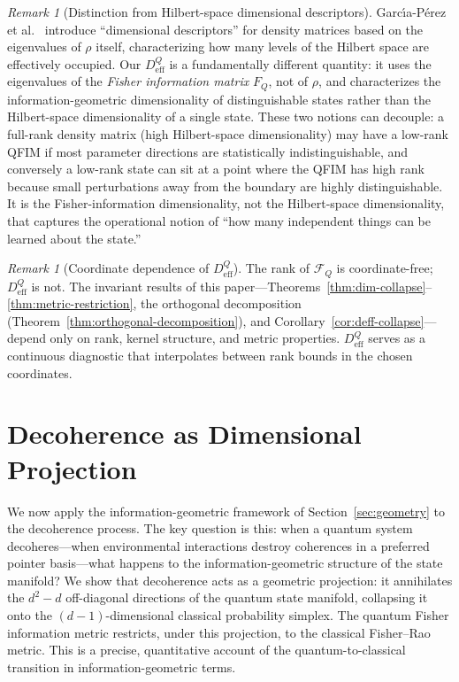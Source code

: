 \documentclass[12pt,a4paper]{article}
\theoremstyle{definition}
\theoremstyle{remark}
\newtheorem{remark}[theorem]{Remark}
\begin{document}
\begin{remark}[Distinction from Hilbert-space dimensional descriptors]
\label{rem:garcia}
Garc\'{\i}a-P\'{e}rez et al.\ \cite{garcia2023descriptors} introduce ``dimensional descriptors'' for density matrices based on the eigenvalues of $\rho$ itself, characterizing how many levels of the Hilbert space are effectively occupied. Our $D_{\mathrm{eff}}^Q$ is a fundamentally different quantity: it uses the eigenvalues of the \emph{Fisher information matrix} $F_Q$, not of $\rho$, and characterizes the information-geometric dimensionality of distinguishable states rather than the Hilbert-space dimensionality of a single state. These two notions can decouple: a full-rank density matrix (high Hilbert-space dimensionality) may have a low-rank QFIM if most parameter directions are statistically indistinguishable, and conversely a low-rank state can sit at a point where the QFIM has high rank because small perturbations away from the boundary are highly distinguishable. It is the Fisher-information dimensionality, not the Hilbert-space dimensionality, that captures the operational notion of ``how many independent things can be learned about the state.''
\end{remark}

\begin{remark}[Coordinate dependence of $D_{\mathrm{eff}}^Q$]
\label{rem:coordinate-dependence}
The rank of $\mathcal{F}_Q$ is coordinate-free; $D_{\mathrm{eff}}^Q$ is not.  The invariant results of this paper---Theorems~\ref{thm:dim-collapse}--\ref{thm:metric-restriction}, the orthogonal decomposition (Theorem~\ref{thm:orthogonal-decomposition}), and Corollary~\ref{cor:deff-collapse}---depend only on rank, kernel structure, and metric properties.  $D_{\mathrm{eff}}^Q$ serves as a continuous diagnostic that interpolates between rank bounds in the chosen coordinates.
\end{remark}

\section{Decoherence as Dimensional Projection}
\label{sec:decoherence}
We now apply the information-geometric framework of Section~\ref{sec:geometry} to the decoherence process. The key question is this: when a quantum system decoheres---when environmental interactions destroy coherences in a preferred pointer basis---what happens to the information-geometric structure of the state manifold? We show that decoherence acts as a geometric projection: it annihilates the $d^2 - d$ off-diagonal directions of the quantum state manifold, collapsing it onto the $(d-1)$-dimensional classical probability simplex. The quantum Fisher information metric restricts, under this projection, to the classical Fisher--Rao metric. This is a precise, quantitative account of the quantum-to-classical transition in information-geometric terms.
\end{document}

